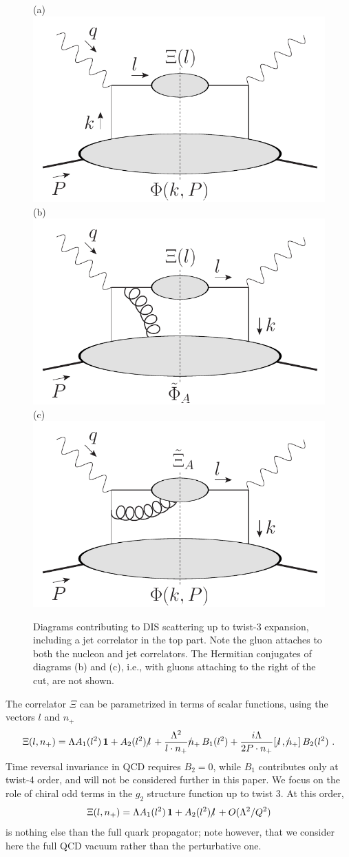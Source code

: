 \documentclass[preprintnumbers,floatfix,nofootinbib]{revtex4}
\newcommand{\lslash}{l \hspace{-0.19cm} / \,}
\newcommand{\nslash}{n \hspace{-0.24cm} / \,}
\begin{document}
\begin{figure}
  \centering
  (a)\includegraphics[width=0.3\linewidth,valign=t]{jetdiagram0}
  \hfill
  (b)\includegraphics[width=0.3\linewidth,valign=t]{jetdiagram2}
  \hfill
  (c)\includegraphics[width=0.3\linewidth,valign=t]{jetdiagram1}
  \caption{Diagrams contributing to DIS scattering up to twist-3 expansion, including a jet correlator in the top part. Note the gluon attaches to both the nucleon and jet correlators. The Hermitian conjugates of diagrams (b) and (c), i.e., with gluons attaching to the right of the cut, are not shown.
  }
  \label{fig:handbags}
\end{figure}

The correlator $\Xi$ can be parametrized in terms of scalar functions, using the vectors $l$ and $n_+$ 
\begin{equation}
\Xi(l,n_+) = \Lambda A_1(l^2)\,{\bm 1} + A_2(l^2)\,\lslash 
+ \frac{\Lambda^2}{l \cdot n_{+}} \nslash_+ \, B_{1}(l^2)
+ \frac{i \Lambda}{2 P \cdot n_{+}} [\,\lslash,\nslash_+ ] \, B_{2}(l^2) \ .
\label{e:jetexpansion}
\end{equation} 
Time reversal invariance in QCD requires $B_{2}=0$, while $B_{1}$ contributes
only at twist-4 order, and will not be considered further in this paper. We
focus on the role of chiral odd terms in the $g_2$ structure function up to
twist 3.  At this order, 
\begin{equation}
  \Xi(l,n_+) = \Lambda A_1(l^2)\,{\bm 1} + A_2(l^2)\,\lslash 
    + O(\Lambda^2/Q^2)
\label{e:jetexpansion-tw3}
\end{equation} 
is nothing else than the full quark propagator; note however, that we consider
here the full QCD vacuum rather than the perturbative one.  
\end{document}
